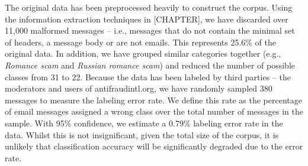The original data has been preprocessed heavily to construct the corpus. Using the information extraction techniques in [CHAPTER], we have discarded over 11,000 malformed messages -- i.e., messages that do not contain the minimal set of headers, a message body or are not emails. This represents 25.6\% of the original data. In addition, we have grouped similar categories together (e.g., \textit{Romance scam} and \textit{Russian romance scam}) and reduced the number of possible classes from 31 to 22. Because the data has been labeled by third parties -- the moderators and users of antifraudintl.org, we have randomly sampled 380 messages to measure the labeling error rate. We define this rate as the percentage of email messages assigned a wrong class over the total number of messages in the sample. With 95\% confidence, we estimate a 0.79\% labeling error rate in the data. Whilst this is not insignificant, given the total size of the corpus, it is unlikely that classification accuracy will be significantly degraded due to the error rate. 


\begin{table}
  \centering
\caption{Corpus statistics}
\end{table} 

